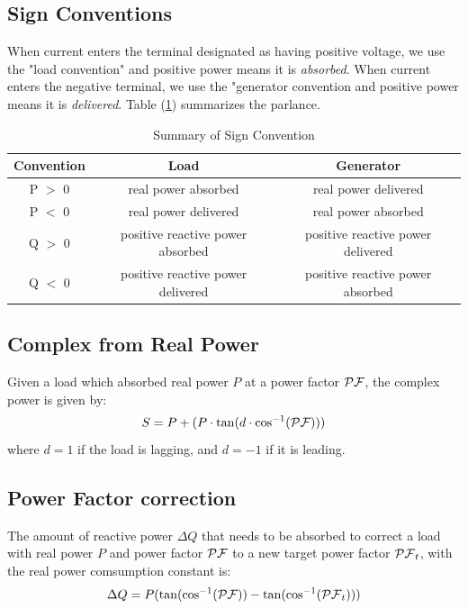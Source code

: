 \documentclass{homework}
\begin{document}
\subsection{Sign Conventions} 
When current enters the terminal designated as having positive 
voltage, we use the "load convention" and positive power
means it is {\it absorbed}.
When current enters the negative terminal, we use the "generator
convention and positive power means it is {\it delivered}.
Table (\ref{table:sign-conventions}) summarizes the parlance.
\begin{table}[h]
    \centering
    \begin{tabular}{|c|c|c|}
        \hline
        Convention & Load & Generator \\
        \hline
        P $>$ 0 & real power absorbed & real power delivered \\
        P $<$ 0 & real power delivered & real power absorbed \\
        Q $>$ 0 & positive reactive power absorbed &
            positive reactive power delivered \\
        Q $<$ 0 & positive reactive power delivered &
            positive reactive power absorbed \\
        \hline
    \end{tabular}
    \caption{Summary of Sign Convention}
    \label{table:sign-conventions}
\end{table}

\subsection{Complex from Real Power}
Given a load which absorbed real power $P$ at a power factor
$\mathcal{PF}$, the complex power is given by:
\begin{equation}
    S = P + (P \cdot \tan(d \cdot \text{cos}^{-1}(\mathcal{PF})))
    \label{eq:complex-from-real}
\end{equation}
where $d = 1$ if the load is lagging, and $d = -1$
if it is leading.

\subsection{Power Factor correction}
The amount of reactive power $\Delta Q$ that needs to be
absorbed to correct a load with real power $P$ and power
factor $\mathcal{PF}$ to a new target power factor $\mathcal{PF}_t$, with
the real power comsumption constant is:
\begin{equation}
    \Delta Q = P (\tan (\text{cos}^{-1}(\mathcal{PF})) - \tan (\text{cos}^{-1}(\mathcal{PF}_t)))
    \label{eq:reactive-power-correction}
\end{equation}
\end{document}
